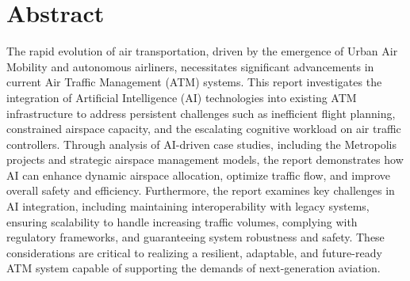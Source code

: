 \section*{Abstract} %

The rapid evolution of air transportation, driven by the emergence of Urban Air Mobility and autonomous airliners, necessitates significant advancements in current Air Traffic Management (ATM) systems. 
This report investigates the integration of Artificial Intelligence (AI) technologies into existing ATM infrastructure to address persistent challenges such as inefficient flight planning, constrained airspace capacity, and the escalating cognitive workload on air traffic controllers. 
Through analysis of AI-driven case studies, including the Metropolis projects and strategic airspace management models, the report demonstrates how AI can enhance dynamic airspace allocation, optimize traffic flow, and improve overall safety and efficiency. 
Furthermore, the report examines key challenges in AI integration, including maintaining interoperability with legacy systems, ensuring scalability to handle increasing traffic volumes, complying with regulatory frameworks, and guaranteeing system robustness and safety. 
These considerations are critical to realizing a resilient, adaptable, and future-ready ATM system capable of supporting the demands of next-generation aviation.
